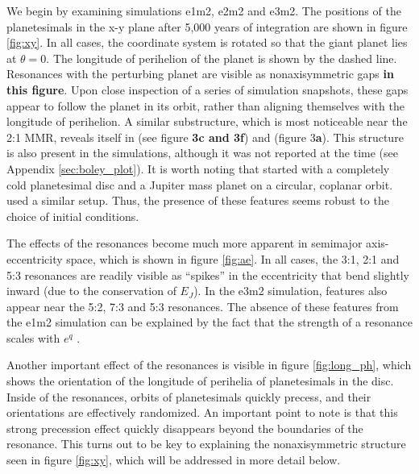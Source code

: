 \documentclass[fleqn,usenatbib]{mnras}
\begin{document}
We begin by examining simulations e1m2, e2m2 and e3m2. The positions of the planetesimals in the x-y plane after 5,000 years of integration are 
shown in figure \ref{fig:xy}. In all cases, the coordinate system is rotated so that the giant planet lies at $\theta = 0$. The longitude of perihelion of 
the planet is shown by the dashed line. Resonances with the perturbing planet are visible as nonaxisymmetric gaps \textbf{in this figure}. Upon close inspection of a 
series of simulation snapshots, these gaps appear to follow the planet in its orbit, rather than aligning themselves with the longitude of perihelion. A 
similar substructure, which is most noticeable near the 2:1 MMR, reveals itself in \citet{2000Icar..143...45R} (see figure \textbf{3c and 3f}) and 
\citet{2016ApJ...818..159T} (figure 3\textbf{a}). This structure is also present in the \citet{2017ApJ...850..103B} simulations, although it was not reported at the 
time (see Appendix \ref{sec:boley_plot}). It is worth noting that \citet{2000Icar..143...45R} started with a completely cold planetesimal disc and a 
Jupiter mass planet on a circular, coplanar
orbit. \citet{2017ApJ...850..103B} used a similar setup.
Thus, the presence of these features seems robust 
to the choice of initial conditions.

The effects of the resonances become much more apparent in semimajor axis-eccentricity space, which is shown in figure \ref{fig:ae}. In all cases, 
the 3:1, 2:1 and 5:3 resonances are readily visible as ``spikes'' in the eccentricity that bend slightly inward (due to the conservation of $E_{J}$). In the 
e3m2 simulation, features also appear near the 5:2, 7:3 and 5:3 resonances. The absence of these features from the e1m2 simulation can be 
explained by the fact that the strength of a resonance scales with $e^{q}$ \citep{1994PhyD...77..289M}.

Another important effect of the resonances is visible in figure \ref{fig:long_ph}, which shows the orientation of the longitude of perihelia of 
planetesimals in the disc. Inside of the resonances, orbits of planetesimals quickly precess, and their orientations are effectively randomized. An 
important point to note is that this strong precession effect quickly disappears beyond the boundaries of the resonance. This turns out to be 
key to explaining the nonaxisymmetric structure seen in figure \ref{fig:xy}, which will be addressed in more detail below.
\end{document}
